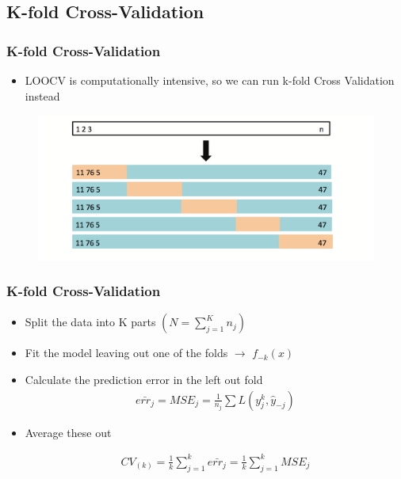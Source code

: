 \documentclass[
  shownotes,
  xcolor={svgnames},
  hyperref={colorlinks,citecolor=DarkBlue,linkcolor=DarkRed,urlcolor=DarkBlue}
  ]{beamer}
\begin{document}
\subsection{K-fold Cross-Validation}
\begin{frame}[fragile]
\frametitle{K-fold Cross-Validation}
\begin{itemize}
\item LOOCV is computationally intensive, so we can run k-fold Cross Validation instead
\end{itemize}


 \begin{figure}[H] \centering
            \captionsetup{justification=centering}
              \includegraphics[scale=0.5]{figures/fig55.png}
       \end{figure}



\end{frame}
\begin{frame}[fragile]
\frametitle{K-fold Cross-Validation}

\begin{itemize}
  \item Split the data into K parts $(N=\sum_{j=1}^K n_j)$
  \medskip
  \item Fit the model leaving out one of the folds $\rightarrow$ $f_{-k}(x)$
  \medskip
  \item Calculate the prediction error in the left out fold 
  \begin{align}
  \bar{err_j}=MSE_j=\frac{1}{n_j}\sum L(y_j^k,\hat y_{-j})
  \end{align}
  \medskip
\item Average these out

\begin{align}
CV_{(k)}=\frac{1}{k}\sum_{j=1}^k \bar{err_j}= \frac{1}{k}\sum_{j=1}^k MSE_j
\end{align}
\end{itemize}

\end{frame}
\end{document}
